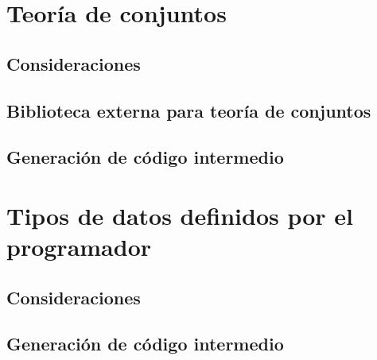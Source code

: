 \section{Teoría de conjuntos}
\subsection{Consideraciones}
\blindtext[1]

\subsection{Biblioteca externa para teoría de conjuntos}
\blindtext[1]

\subsection{Generación de código intermedio}
\blindtext[1]

\section{Tipos de datos definidos por el programador}
\blindtext[1]
\subsection{Consideraciones}
\subsection{Generación de código intermedio}

